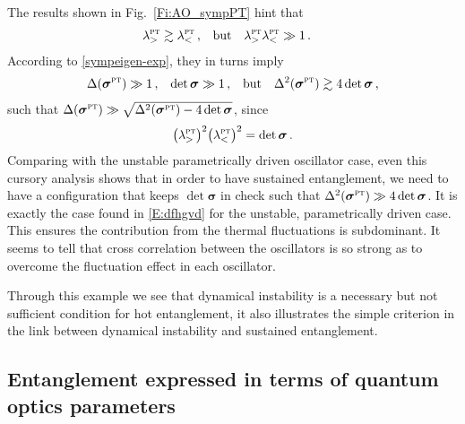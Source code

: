 \documentclass[11pt,a4paper]{article}
\begin{document}
The results shown in Fig.~\ref{Fi:AO_sympPT} hint that
\begin{align}\label{E:gfkdbsert}
	\lambda^{\textsc{pt}}_{>}&\gtrsim\lambda^{\textsc{pt}}_{<}\,,&&\text{but}&\lambda^{\textsc{pt}}_{>}\lambda^{\textsc{pt}}_{<}&\gg1\,.
\end{align}
According to \eqref{sympeigen-exp}, they in turns imply
\begin{align}
	\Delta(\bm{\sigma}^{\textsc{pt}})&\gg1\,, &\det\bm{\sigma}&\gg1\,,&&\text{but} &\Delta^{2}(\bm{\sigma}^{\textsc{pt}})\gtrsim4\det\bm{\sigma}\,,
\end{align}
such that $\Delta(\bm{\sigma}^{\textsc{pt}})\gg\sqrt{\Delta^{2}(\bm{\sigma}^{\textsc{pt}})-4\det\bm{\sigma}}$, since
\begin{align}
	\bigl(\lambda^{\textsc{pt}}_{>}\bigr)^{2}\bigl(\lambda^{\textsc{pt}}_{<}\bigr)^{2}=\det\bm{\sigma}\,.
\end{align}
Comparing with the unstable parametrically driven oscillator case, even this cursory analysis shows that in order to have sustained entanglement, we need to have a configuration that keeps $\det\bm{\sigma}$ in check such that $\Delta^{2}(\bm{\sigma}^{\textsc{pt}})\gg4\det\bm{\sigma}$. It is exactly the case found in \eqref{E:dfhgvd} for the unstable, parametrically driven case. This ensures the contribution from the thermal fluctuations is subdominant. It seems to tell that cross correlation between the oscillators is so strong as to overcome the fluctuation effect in each oscillator. 


Through this example we see that dynamical instability is a necessary but not sufficient condition for hot entanglement, it also illustrates the simple criterion in the link between dynamical instability and sustained entanglement.
 



\subsection{Entanglement expressed in terms of quantum optics parameters}
\end{document}
